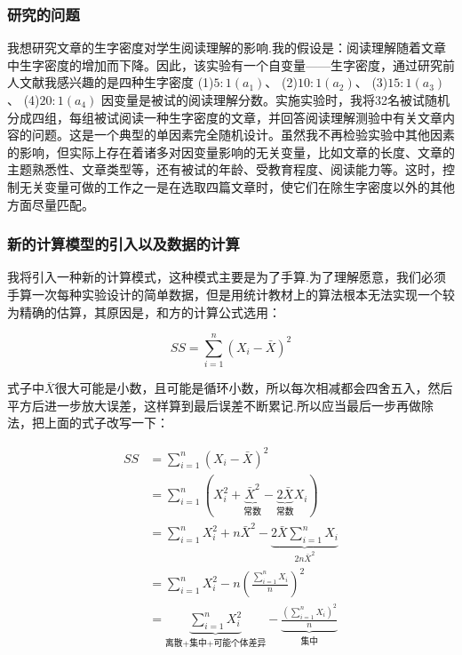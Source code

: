 \subsubsection{研究的问题}
我想研究文章的生字密度对学生阅读理解的影响.我的假设是：阅读理解随着文章中生字密度的增加而下降。因此，该实验有一个自变量——生字密度，通过研究前人文献我感兴趣的是四种生字密度
(1)$5:1\left(a_1\right)$、
(2)$10:1\left(a_2\right)$、
(3)$15:1\left(a_3\right)$、
(4)$20:1\left(a_4\right)$
因变量是被试的阅读理解分数。实施实验时，我将32名被试随机分成四组，每组被试阅读一种生字密度的文章，并回答阅读理解测验中有关文章内容的问题。这是一个典型的单因素完全随机设计。虽然我不再检验实验中其他因素的影响，但实际上存在着诸多对因变量影响的无关变量，比如文章的长度、文章的主题熟悉性、文章类型等，还有被试的年龄、受教育程度、阅读能力等。这时，控制无关变量可做的工作之一是在选取四篇文章时，使它们在除生字密度以外的其他方面尽量匹配。

\subsubsection{新的计算模型的引入以及数据的计算}
我将引入一种新的计算模式，这种模式主要是为了手算.为了理解愿意，我们必须手算一次每种实验设计的简单数据，但是用统计教材上的算法根本无法实现一个较为精确的估算，其原因是，和方的计算公式选用：

$$
    SS =
        \sum\limits_{i=1}^{n}
        \left( 
            X_i -\bar{X} 
        \right)^2
$$

式子中$\bar{X}$很大可能是小数，且可能是循环小数，所以每次相减都会四舍五入，然后平方后进一步放大误差，这样算到最后误差不断累记.所以应当最后一步再做除法，把上面的式子改写一下：

\begin{align*}
SS  & = \sum\limits_{i=1}^n{\left( X_i-\bar{X} \right) ^2}
\\
    & =\sum\limits_{i=1}^n{\left( X_{i}^{2}+\underset{\text{常数}}{\underbrace{\bar{X}^2}}-\underset{\text{常数}}{\underbrace{2\bar{X}}}X_i \right)}
\\
    & =\sum\limits_{i=1}^n{X_{i}^{2}}+n\bar{X}^2-\underset{2n\bar{X}^2}{\underbrace{2\bar{X}\sum\limits_{i=1}^n{X_i}}}
\\
    & =\sum\limits_{i=1}^n{X_{i}^{2}}-n\left( \frac{\sum\limits_{i=1}^n{X_i}}{n} \right) ^2
\\
    &= \underset{\text{离散+集中+可能个体差异}}{\underbrace{\sum\limits_{i=1}^n{X_{i}^{2}}}}-\underset{\text{集中}}{\underbrace{\frac{\left( \sum\limits_{i=1}^n{X_i} \right) ^2}{n}}}
\end{align*}

